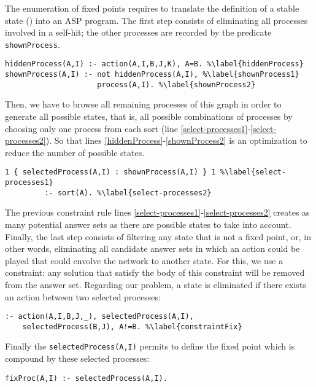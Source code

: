 The enumeration of fixed points requires to translate the definition of a stable state ()
into an ASP program.
The first step consists of eliminating all processes involved in a self-hit;
the other processes are recorded by the predicate \texttt{shownProcess}.
\begin{lstlisting}
hiddenProcess(A,I) :- action(A,I,B,J,K), A=B. %\label{hiddenProcess}
shownProcess(A,I) :- not hiddenProcess(A,I), %\label{shownProcess1}
                     process(A,I). %\label{shownProcess2}
\end{lstlisting}
Then, we have to browse all remaining processes of this graph in order to generate all possible states,
that is, all possible combinations of processes by choosing only one process from each sort (line \ref{select-processes1}-\ref{select-processes2}). So that lines \ref{hiddenProcess}-\ref{shownProcess2} is an optimization to reduce the number of possible states.
\begin{lstlisting}
1 { selectedProcess(A,I) : shownProcess(A,I) } 1 %\label{select-processes1}
         :- sort(A). %\label{select-processes2}
\end{lstlisting}
The previous constraint rule lines \ref{select-processes1}-\ref{select-processes2} creates as many potential answer sets as there are possible states
to take into account.
Finally, the last step consists of filtering any state that is not a fixed point,
or, in other words, eliminating all candidate answer sets in which an action could be played that could envolve the network to another state.
For this, we use a constraint:
any solution that satisfy the body of this constraint will be removed from the answer set.
Regarding our problem, a state is eliminated if there exists an action between two selected processes:
\begin{lstlisting}
:- action(A,I,B,J,_), selectedProcess(A,I),
    selectedProcess(B,J), A!=B. %\label{constraintFix}
\end{lstlisting}
Finally the \texttt{selectedProcess(A,I)} permits to define the fixed point which is compound by these selected processes:
\begin{lstlisting}
fixProc(A,I) :- selectedProcess(A,I).
\end{lstlisting}

